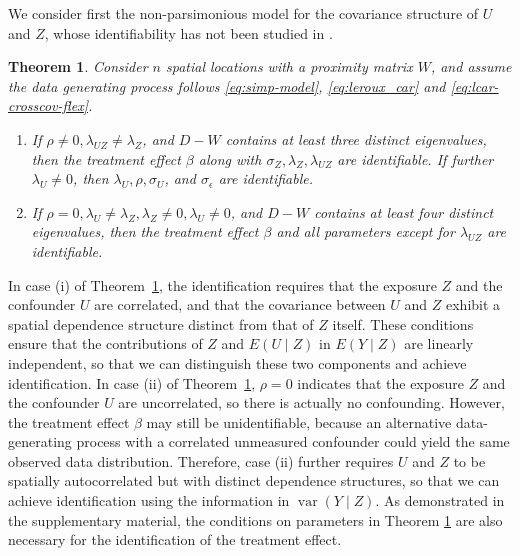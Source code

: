 \documentclass[11pt]{article}
\newtheorem{theorem}{Theorem}
\theoremstyle{definition}
\theoremstyle{remark}
\DeclareMathOperator{\var}{var}
\begin{document}
We consider first the non-parsimonious model 
for the covariance structure of $U$ and $Z$, whose identifiability has not been studied in \citet{guan2023spectral}. 

\begin{theorem}\label{thm:lcar-flex-identifiability}
Consider $n$ spatial locations with a proximity matrix $W$, and assume the data generating process follows \eqref{eq:simp-model}, \eqref{eq:leroux_car} and \eqref{eq:lcar-crosscov-flex}. 
\begin{enumerate}[label=(\roman*), topsep=1ex,itemsep=-0.3ex,partopsep=1ex,parsep=1ex]
    \item If $\rho \neq 0, \lambda_{UZ} \neq \lambda_Z$, and $D-W$ contains at least three distinct eigenvalues, then the treatment effect $\beta$ along with $\sigma_Z, \lambda_Z, \lambda_{UZ}$ are identifiable. If further $\lambda_U\neq 0$, then $\lambda_U, \rho, \sigma_U$, and $\sigma_\epsilon$ are identifiable. 
    \item If $\rho =0, \lambda_U\neq \lambda_Z, \lambda_Z \neq 0, \lambda_U \neq 0$, and $D-W$ contains at least four distinct eigenvalues, then the treatment effect $\beta$ and all parameters except for $\lambda_{UZ}$ are identifiable.
\end{enumerate}
\end{theorem}


In case (i) of Theorem~\ref{thm:lcar-flex-identifiability}, 
the identification requires that the exposure $Z$ and the confounder $U$ are correlated, 
and that the covariance between $U$ and $Z$ exhibit a spatial dependence structure 
distinct from that of $Z$ itself.
These conditions ensure that the contributions of $Z$ and $E(U \mid Z)$ in $E(Y \mid Z)$ 
are linearly independent, so that we can distinguish these two components and achieve identification. 
In case (ii) of Theorem~\ref{thm:lcar-flex-identifiability}, $\rho=0$ indicates that the exposure $Z$ and the confounder $U$ are uncorrelated, so there is actually no confounding. 
However, the treatment effect $\beta$ may still be unidentifiable, 
because an alternative data-generating process with a correlated unmeasured confounder 
could yield the same observed data distribution. Therefore, case (ii) further requires $U$ and $Z$ to be spatially autocorrelated 
but with distinct dependence structures, 
so that we can achieve identification using the information in $\var(Y \mid Z)$.
As demonstrated in the supplementary material, the conditions on parameters in Theorem \ref{thm:lcar-flex-identifiability} are also necessary for the identification of the treatment effect. 
\end{document}
